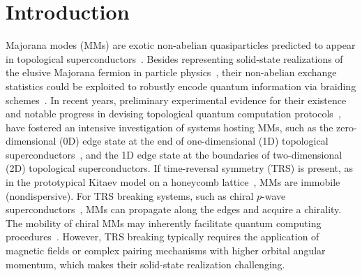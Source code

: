 \documentclass[aps,prb,twocolumn,superscriptaddress,groupedaddress]{revtex4}
\begin{document}
\maketitle



\section{Introduction}

Majorana modes (MMs) are exotic non-abelian quasiparticles predicted to appear in topological superconductors~\cite{AliceaReview,Sato:2017, Aguado:2017}.
Besides representing solid-state realizations of the elusive Majorana fermion in particle physics~\cite{Majorana:1937}, their non-abelian exchange statistics could be exploited to robustly encode quantum information via braiding schemes~\cite{Kitaev:2003,Beenakker:2013,DasSarma:2015}.
In recent years, preliminary experimental evidence for their existence~\cite{Mourik:2012, Albrecht:2016, Deng:2016, Lutchyn:2018, ZhangNature:2018, Jaeck:2019, Manna:2020, Frolov:2020}  and notable progress in devising topological quantum computation protocols~\cite{Aasen:2016,Litinski:2018,Oreg:2020}, have fostered an intensive investigation of systems hosting MMs, such as the zero-dimensional (0D) edge state at the end of one-dimensional (1D) topological superconductors~\cite{Kitaev:2001}, and the 1D edge state at the boundaries of two-dimensional (2D) topological superconductors\cite{KitaevAnnals:2006,Nakosai13,Chen15_Majorana_multiferroics}.
If time-reversal symmetry (TRS) is present, as in the prototypical Kitaev model on a honeycomb lattice~\cite{KitaevAnnals:2006}, MMs are immobile (nondispersive).
For TRS breaking systems,  such as chiral $p$-wave superconductors~\cite{Read:2000,Chiu:2018, WangPRL:2018, He:2019}, MMs can propagate along the edges and acquire a chirality.
The mobility of chiral MMs may inherently facilitate quantum computing procedures~\cite{Lian:2018}.
However, TRS breaking typically requires the application of magnetic fields or complex pairing mechanisms with higher orbital angular momentum, which makes their solid-state realization challenging.
\end{document}
